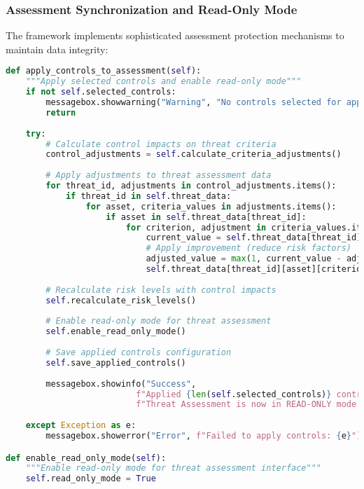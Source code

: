 \documentclass[binding=0.6cm]{sapthesis}
\begin{document}
\subsubsection{Assessment Synchronization and Read-Only Mode}

The framework implements sophisticated assessment protection mechanisms to maintain data integrity:

\begin{lstlisting}[language=Python, caption=Assessment Protection Implementation]
def apply_controls_to_assessment(self):
    """Apply selected controls and enable read-only mode"""
    if not self.selected_controls:
        messagebox.showwarning("Warning", "No controls selected for application.")
        return
    
    try:
        # Calculate control impacts on threat criteria
        control_adjustments = self.calculate_criteria_adjustments()
        
        # Apply adjustments to threat assessment data
        for threat_id, adjustments in control_adjustments.items():
            if threat_id in self.threat_data:
                for asset, criteria_values in adjustments.items():
                    if asset in self.threat_data[threat_id]:
                        for criterion, adjustment in criteria_values.items():
                            current_value = self.threat_data[threat_id][asset][criterion]
                            # Apply improvement (reduce risk factors)
                            adjusted_value = max(1, current_value - adjustment)
                            self.threat_data[threat_id][asset][criterion] = adjusted_value
        
        # Recalculate risk levels with control impacts
        self.recalculate_risk_levels()
        
        # Enable read-only mode for threat assessment
        self.enable_read_only_mode()
        
        # Save applied controls configuration
        self.save_applied_controls()
        
        messagebox.showinfo("Success", 
                          f"Applied {len(self.selected_controls)} controls successfully.\n"
                          f"Threat Assessment is now in READ-ONLY mode.")
        
    except Exception as e:
        messagebox.showerror("Error", f"Failed to apply controls: {e}")

def enable_read_only_mode(self):
    """Enable read-only mode for threat assessment interface"""
    self.read_only_mode = True
    

\end{lstlisting}
\end{document}
